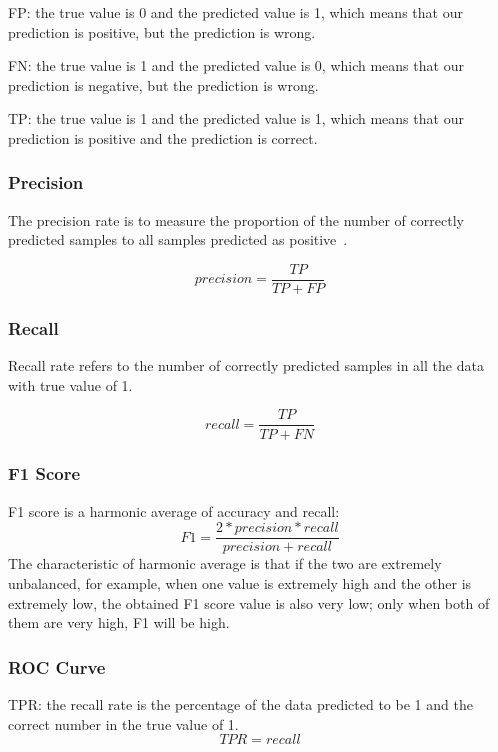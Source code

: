 FP:
the true value is 0 and the predicted value is 1,
which means that our prediction is positive,
but the prediction is wrong.

FN:
the true value is 1 and the predicted value is 0,
 which means that our prediction is negative,
  but the prediction is wrong.

TP:
the true value is 1 and the predicted value is 1,
which means that our prediction is positive and the
prediction is correct.

\subsubsection{Precision}

The precision rate is to measure the proportion of
the number of correctly predicted samples to all
samples predicted as positive~\cite{ting2010precision}.

\begin{equation}
  precision=\frac{TP}{TP+FP}
\end{equation}

\subsubsection{Recall}
Recall rate refers to the number of correctly
predicted samples in all the data with true
value of 1.

\begin{equation}
  recall=\frac{TP}{TP+FN}
\end{equation}

\subsubsection{F1 Score}
F1 score is a harmonic average of accuracy and recall:
\begin{equation}
  F1=\frac{2*precision*recall}{precision+recall}
\end{equation}
The characteristic of harmonic average is that if
the two are extremely unbalanced,
for example, when one value is extremely
high and the other is extremely low,
the obtained F1 score value is also very low;
only when both of them are very high,
F1 will be high.
\subsubsection{ROC Curve}
TPR:
the recall rate is the percentage of the data
predicted to be 1 and the correct number in the
true value of 1.
\begin{equation}
TPR=recall
 \end{equation}

